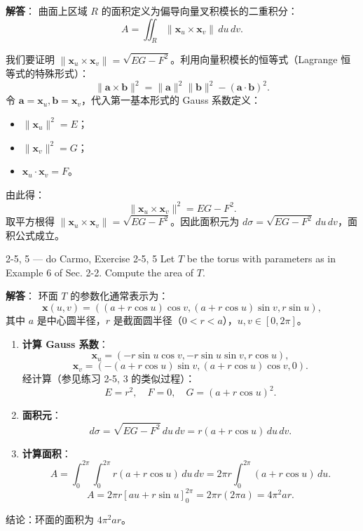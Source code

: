 \begin{solution}
\textbf{解答}：
曲面上区域 $R$ 的面积定义为偏导向量叉积模长的二重积分：
\[
A = \iint_R \|\mathbf{x}_u \times \mathbf{x}_v\|\, du\, dv.
\]

我们要证明 $\|\mathbf{x}_u \times \mathbf{x}_v\| = \sqrt{EG - F^2}$。利用向量积模长的恒等式（Lagrange 恒等式的特殊形式）：
\[
\|\mathbf{a} \times \mathbf{b}\|^2 = \|\mathbf{a}\|^2 \|\mathbf{b}\|^2 - (\mathbf{a} \cdot \mathbf{b})^2.
\]
令 $\mathbf{a} = \mathbf{x}_u, \mathbf{b} = \mathbf{x}_v$，代入第一基本形式的 Gauss 系数定义：
\begin{itemize}
    \item $\|\mathbf{x}_u\|^2 = E$；
    \item $\|\mathbf{x}_v\|^2 = G$；
    \item $\mathbf{x}_u \cdot \mathbf{x}_v = F$。
\end{itemize}
由此得：
\[
\|\mathbf{x}_u \times \mathbf{x}_v\|^2 = EG - F^2.
\]
取平方根得 $\|\mathbf{x}_u \times \mathbf{x}_v\| = \sqrt{EG - F^2}$。因此面积元为 $d\sigma = \sqrt{EG - F^2}\, du\, dv$，面积公式成立。
\end{solution}

\begin{exercise}{2-5, 5 — do Carmo, Exercise 2-5, 5}
Let $T$ be the torus with parameters as in Example 6 of Sec. 2-2. Compute the area of $T$.
\end{exercise}

\begin{solution}
\textbf{解答}：
环面 $T$ 的参数化通常表示为：
\[
\mathbf{x}(u, v) = ((a + r \cos u) \cos v, (a + r \cos u) \sin v, r \sin u),
\]
其中 $a$ 是中心圆半径，$r$ 是截面圆半径（$0 < r < a$），$u, v \in [0, 2\pi]$。

\begin{enumerate}
    \item \textbf{计算 Gauss 系数}：
    \[
    \mathbf{x}_u = (-r \sin u \cos v, -r \sin u \sin v, r \cos u),
    \]
    \[
    \mathbf{x}_v = (-(a + r \cos u) \sin v, (a + r \cos u) \cos v, 0).
    \]
    经计算（参见练习 2-5, 3 的类似过程）：
    \[
    E = r^2, \quad F = 0, \quad G = (a + r \cos u)^2.
    \]
    \item \textbf{面积元}：
    \[
    d\sigma = \sqrt{EG - F^2}\, du\, dv = r(a + r \cos u)\, du\, dv.
    \]
    \item \textbf{计算面积}：
    \[
    A = \int_0^{2\pi} \int_0^{2\pi} r(a + r \cos u)\, du\, dv = 2\pi r \int_0^{2\pi} (a + r \cos u)\, du.
    \]
    \[
    A = 2\pi r [au + r \sin u]_0^{2\pi} = 2\pi r (2\pi a) = 4\pi^2 ar.
    \]
\end{enumerate}
结论：环面的面积为 $4\pi^2 ar$。
\end{solution}

